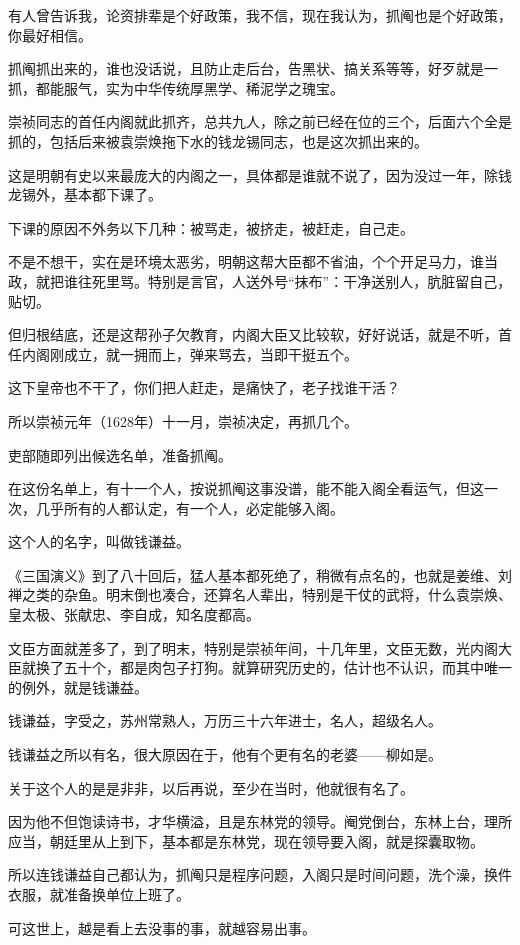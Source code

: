 \begin{multicols}{\theparacolNo}
有人曾告诉我，论资排辈是个好政策，我不信，现在我认为，抓阄也是个好政策，你最好相信。

抓阄抓出来的，谁也没话说，且防止走后台，告黑状、搞关系等等，好歹就是一抓，都能服气，实为中华传统厚黑学、稀泥学之瑰宝。

崇祯同志的首任内阁就此抓齐，总共九人，除之前已经在位的三个，后面六个全是抓的，包括后来被袁崇焕拖下水的钱龙锡同志，也是这次抓出来的。

这是明朝有史以来最庞大的内阁之一，具体都是谁就不说了，因为没过一年，除钱龙锡外，基本都下课了。

下课的原因不外务以下几种：被骂走，被挤走，被赶走，自己走。

不是不想干，实在是环境太恶劣，明朝这帮大臣都不省油，个个开足马力，谁当政，就把谁往死里骂。特别是言官，人送外号“抹布”：干净送别人，肮脏留自己，贴切。

但归根结底，还是这帮孙子欠教育，内阁大臣又比较软，好好说话，就是不听，首任内阁刚成立，就一拥而上，弹来骂去，当即干挺五个。

这下皇帝也不干了，你们把人赶走，是痛快了，老子找谁干活？

所以崇祯元年（1628年）十一月，崇祯决定，再抓几个。

吏部随即列出候选名单，准备抓阄。

在这份名单上，有十一个人，按说抓阄这事没谱，能不能入阁全看运气，但这一次，几乎所有的人都认定，有一个人，必定能够入阁。

这个人的名字，叫做钱谦益。

《三国演义》到了八十回后，猛人基本都死绝了，稍微有点名的，也就是姜维、刘禅之类的杂鱼。明末倒也凑合，还算名人辈出，特别是干仗的武将，什么袁崇焕、皇太极、张献忠、李自成，知名度都高。

文臣方面就差多了，到了明末，特别是崇祯年间，十几年里，文臣无数，光内阁大臣就换了五十个，都是肉包子打狗。就算研究历史的，估计也不认识，而其中唯一的例外，就是钱谦益。

钱谦益，字受之，苏州常熟人，万历三十六年进士，名人，超级名人。

钱谦益之所以有名，很大原因在于，他有个更有名的老婆——柳如是。

关于这个人的是是非非，以后再说，至少在当时，他就很有名了。

因为他不但饱读诗书，才华横溢，且是东林党的领导。阉党倒台，东林上台，理所应当，朝廷里从上到下，基本都是东林党，现在领导要入阁，就是探囊取物。

所以连钱谦益自己都认为，抓阄只是程序问题，入阁只是时间问题，洗个澡，换件衣服，就准备换单位上班了。

可这世上，越是看上去没事的事，就越容易出事。


\end{multicols}
